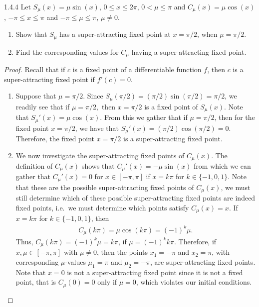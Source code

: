 \begin{problem}{1.4.4}
  Let $S_\mu (x) = \mu \sin(x)$, $0 \leq x \leq 2\pi$, $0 < \mu \leq \pi$ and $C_\mu (x) = \mu \cos(x)$,
  $-\pi \leq x \leq \pi$ and $-\pi \leq \mu \leq \pi$, $\mu \neq 0$.
  \begin{enumerate}
    \item Show that $S_\mu$ has a super-attracting fixed point at $x = \pi/2$, when $\mu = \pi/2$.
    \item Find the corresponding values for $C_\mu$ having a super-attracting fixed point.
  \end{enumerate}
\end{problem}

\begin{proof}
  Recall that if $c$ is a fixed point of a differentiable function $f$, then $c$ is a super-attracting
  fixed point if $f'(c) = 0$.

  \begin{enumerate}
    \item Suppose that $\mu = \pi/2$. Since $S_\mu(\pi/2) = (\pi/2) \sin(\pi/2) = \pi/2$,
      we readily see that if $\mu = \pi/2,$ then $x=\pi /2$ is a fixed point of $S_\mu(x)$.
      Note that $S_\mu '(x) = \mu \cos(x)$. From this we gather that if $\mu = \pi/2$,
      then for the fixed point $x = \pi/2$, we have that $S_\mu ' (x) = (\pi/2) \cos(\pi/2) = 0$.
      Therefore, the fixed point $x=\pi/2$ is a super-attracting fixed point.
    \item We now investigate the super-attracting fixed points of $C_\mu(x)$. The
      definition of $C_\mu(x)$ shows that $C_\mu'(x) = - \mu\sin(x)$ from which
      we can gather that $C_\mu'(x) = 0$ for $x\in [-\pi, \pi]$ if $x = k \pi$ for
      $k\in \{-1, 0, 1\}$. Note that these are the possible super-attracting
      fixed points of $C_\mu(x)$, we must still determine which
      of these possible super-attracting fixed points are indeed fixed points, i.e.\ we
      must determine which points satisfy $C_\mu(x) = x$. If $x = k \pi$ for
      $k\in \{-1, 0, 1\}$, then
      \begin{align*}
        C_\mu(k\pi ) = \mu\cos(k\pi) =(-1)^k\mu.
      \end{align*}
      Thus, $C_\mu(k\pi) = (-1)^k \mu = k \pi$, if $\mu = (-1)^k k\pi$. Therefore, if $x, \mu \in [-\pi, \pi]$ with $\mu \neq 0$,
      then the points $x_1 = -\pi$ and $x_2 = \pi$, with corresponding
      $\mu$-values $\mu_1=\pi$ and $\mu_2 = -\pi$, are super-attracting fixed points.
      Note that $x = 0$ is not a super-attracting fixed point
      since it is not a fixed point, that is $C_\mu(0) = 0$ only if $\mu = 0$, which violates our initial conditions.
  \end{enumerate}
\end{proof}
\newpage
